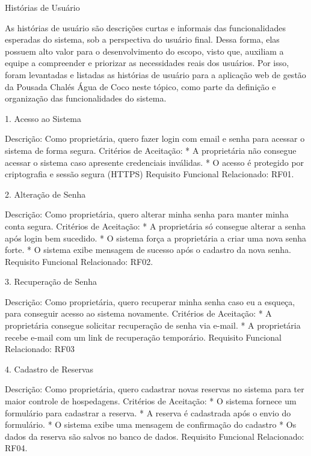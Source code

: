 ﻿Histórias de Usuário


        As histórias de usuário são descrições curtas e informais das funcionalidades esperadas do sistema, sob a perspectiva do usuário final. Dessa forma, elas possuem alto valor para o desenvolvimento do escopo, visto que, auxiliam a equipe a compreender e priorizar as necessidades reais dos usuários. Por isso, foram levantadas e listadas as histórias de usuário para a aplicação web de gestão da Pousada Chalés Água de Coco neste tópico, como parte da definição e organização das funcionalidades do sistema.


1. Acesso ao Sistema


Descrição: Como proprietária, quero fazer login com email e senha para acessar o sistema de forma segura.
Critérios de Aceitação:
* A proprietária não consegue acessar o sistema caso apresente credenciais inválidas.
* O acesso é protegido por criptografia e sessão segura (HTTPS)
Requisito Funcional Relacionado: RF01.




2. Alteração de Senha 


Descrição: Como proprietária, quero alterar minha senha para manter minha conta segura.
Critérios de Aceitação:
* A proprietária só consegue alterar a senha após login bem sucedido.
* O sistema força a proprietária a criar uma nova senha forte.
* O sistema exibe mensagem de sucesso após o cadastro da nova senha.
Requisito Funcional Relacionado: RF02.


3. Recuperação de  Senha


Descrição: Como proprietária, quero recuperar minha senha caso eu a esqueça, para conseguir acesso ao sistema novamente.
Critérios de Aceitação:
* A proprietária consegue solicitar recuperação de senha via e-mail.
* A proprietária recebe e-mail com um link de recuperação temporário. 
Requisito Funcional Relacionado: RF03








4. Cadastro de Reservas


Descrição: Como proprietária, quero cadastrar novas reservas no sistema para ter maior controle de hospedagens.
Critérios de Aceitação:
* O sistema fornece um formulário para cadastrar a reserva.
* A reserva é cadastrada após o envio do formulário.
* O sistema exibe uma mensagem de confirmação do cadastro
* Os dados da reserva são salvos no banco de dados. 
Requisito Funcional Relacionado: RF04.


